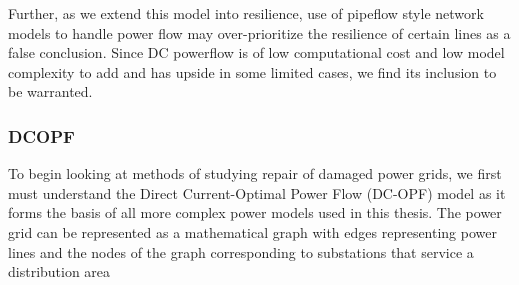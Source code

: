 \documentclass{article}
\begin{document}
	Further, as we extend this model into resilience, use of pipeflow style network models to handle power flow may over-prioritize the resilience of certain lines as a false conclusion. Since DC powerflow is of low computational cost and low model complexity to add and has upside in some limited cases, we find its inclusion to be warranted.
	\subsubsection{DCOPF}
		To begin looking at methods of studying repair of damaged power grids, we first must understand the Direct Current-Optimal Power Flow (DC-OPF) model as it forms the basis of all more complex power models used in this thesis. The power grid can be represented as a mathematical graph with edges representing power lines and the nodes of the graph corresponding to substations that service a distribution area
		
\end{document}

